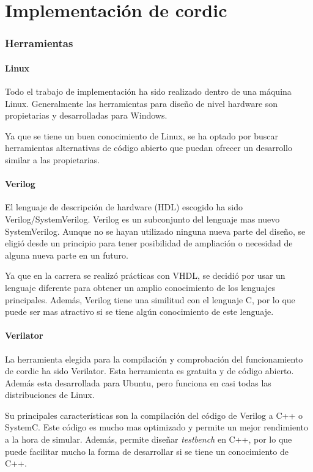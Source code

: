 \chapter{Implementación de \gls{cordic}}

\subsection{Herramientas}
\subsubsection{Linux}
Todo el trabajo de implementación ha sido realizado dentro de una máquina Linux. Generalmente las herramientas para diseño de nivel hardware son propietarias y desarrolladas para Windows.

Ya que se tiene un buen conocimiento de Linux, se ha optado por buscar herramientas alternativas de código abierto que puedan ofrecer un desarrollo similar a las propietarias.
\subsubsection{Verilog}
El lenguaje de descripción de hardware (HDL) escogido ha sido Verilog/SystemVerilog. Verilog es un subconjunto del lenguaje mas nuevo SystemVerilog. Aunque no se hayan utilizado ninguna nueva parte del diseño, se eligió desde un principio para tener posibilidad de ampliación o necesidad de alguna nueva parte en un futuro.

Ya que en la carrera se realizó prácticas con VHDL, se decidió por usar un lenguaje diferente para obtener un amplio conocimiento de los lenguajes principales. Además, Verilog tiene una similitud con el lenguaje C, por lo que puede ser mas atractivo si se tiene algún conocimiento de este lenguaje.

\subsubsection{Verilator}
La herramienta elegida para la compilación y comprobación del funcionamiento de \gls{cordic} ha sido Verilator. Esta herramienta es gratuita y de código abierto. Además esta desarrollada para Ubuntu, pero funciona en casi todas las distribuciones de Linux.

Su principales características son la compilación del código de Verilog a C++ o SystemC. Este código es mucho mas optimizado y permite un mejor rendimiento a la hora de simular. Además, permite diseñar \textit{testbench} en C++, por lo que puede facilitar mucho la forma de desarrollar si se tiene un conocimiento de C++.

